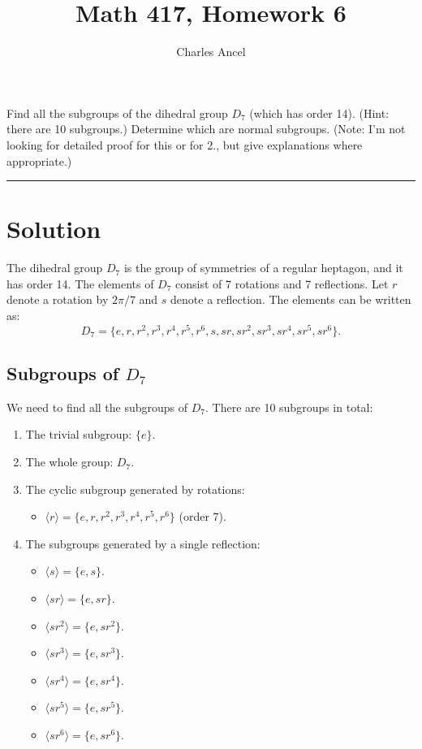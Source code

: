 \documentclass[12pt]{amsart}
\title{Math 417, Homework 6}
\author{Charles Ancel}
\theoremstyle{definition}
\numberwithin{equation}{section}
\begin{document}
\maketitle

\begin{exercise}{1} Find all the subgroups of the dihedral group \(D_7\) (which has order 14). (Hint: there are 10 subgroups.) Determine which are normal subgroups. (Note: I'm not looking for detailed proof for this or for 2., but give explanations where appropriate.)

    \noindent\rule{\linewidth}{1pt}
    
    \section*{Solution}

    The dihedral group \(D_7\) is the group of symmetries of a regular heptagon, and it has order 14. The elements of \(D_7\) consist of 7 rotations and 7 reflections. Let \(r\) denote a rotation by \(2\pi/7\) and \(s\) denote a reflection. The elements can be written as:
    \[
    D_7 = \{ e, r, r^2, r^3, r^4, r^5, r^6, s, sr, sr^2, sr^3, sr^4, sr^5, sr^6 \}.
    \]
    
    \subsection*{Subgroups of \(D_7\)}
    
    We need to find all the subgroups of \(D_7\). There are 10 subgroups in total:
    
    \begin{enumerate}[label=\arabic*.]
        \item The trivial subgroup: \(\{e\}\).
        \item The whole group: \(D_7\).
        \item The cyclic subgroup generated by rotations:
            \begin{itemize}[label=--]
                \item \(\langle r \rangle = \{e, r, r^2, r^3, r^4, r^5, r^6\}\) (order 7).
            \end{itemize}
        \item The subgroups generated by a single reflection:
            \begin{itemize}[label=--]
                \item \(\langle s \rangle = \{e, s\}\).
                \item \(\langle sr \rangle = \{e, sr\}\).
                \item \(\langle sr^2 \rangle = \{e, sr^2\}\).
                \item \(\langle sr^3 \rangle = \{e, sr^3\}\).
                \item \(\langle sr^4 \rangle = \{e, sr^4\}\).
                \item \(\langle sr^5 \rangle = \{e, sr^5\}\).
                \item \(\langle sr^6 \rangle = \{e, sr^6\}\).
            \end{itemize}
    \end{enumerate}
    

\end{exercise}
\end{document}
